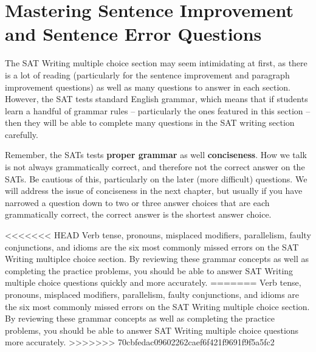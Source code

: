 \section{Mastering Sentence Improvement and Sentence Error Questions}

The SAT Writing multiple choice section may seem intimidating at first, as there is a lot of reading (particularly for the sentence improvement and paragraph improvement questions) as well as many questions to answer in each section. However, the SAT tests standard English grammar, which means that if students learn a handful of grammar rules -- particularly the ones featured in this section -- then they will be able to complete many questions in the SAT writing section carefully.

\bigskip
Remember, the SATs tests \textbf{proper grammar} as well \textbf{conciseness}. How we talk is not always grammatically correct, and therefore not the correct answer on the SATs. Be cautious of this, particularly on the later (more difficult) questions. We will address the issue of conciseness in the next chapter, but usually if you have narrowed a question down to two or three answer choices that are each grammatically correct, the correct answer is the shortest answer choice.

\bigskip
<<<<<<< HEAD
Verb tense, pronouns, misplaced modifiers, parallelism, faulty conjunctions, and idioms are the six
most commonly missed errors on the SAT Writing multiplce choice section. By reviewing these
grammar concepts as well as completing the practice problems, you should be able to answer SAT
Writing multiple choice questions quickly and more accurately.
=======
Verb tense, pronouns, misplaced modifiers, parallelism, faulty conjunctions, and idioms are the six most commonly missed errors on the SAT Writing multiple choice section. By reviewing these grammar concepts as well as completing the practice problems, you should be able to answer SAT Writing multiple choice questions more accurately.
>>>>>>> 70cbfedac09602262caef6f421f9691f9f5a5fc2
